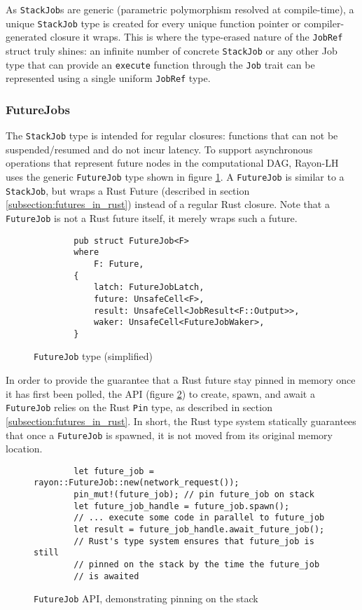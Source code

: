 \documentclass[bsc,frontabs,singlespacing,parskip,deptreport,normalheadings]{infthesis}
\begin{document}
As \texttt{StackJob}s are generic (parametric polymorphism resolved at
compile-time), a unique \texttt{StackJob} type is created for every unique
function pointer or compiler-generated closure it wraps. This is where the
type-erased nature of the \texttt{JobRef} struct truly shines: an infinite
number of concrete \texttt{StackJob} or any other Job type that can provide an
\texttt{execute} function through the \texttt{Job} trait can be represented
using a single uniform \texttt{JobRef} type.

\subsubsection*{FutureJobs}

The \texttt{StackJob} type is intended for regular closures: functions that can
not be suspended/resumed and do not incur latency. To support asynchronous
operations that represent future nodes in the computational DAG, Rayon-LH uses
the generic \texttt{FutureJob} type shown in figure \ref{fig:futurejob}. A
\texttt{FutureJob} is similar to a \texttt{StackJob}, but wraps a Rust Future
(described in section \ref{subsection:futures_in_rust}) instead of a regular
Rust closure. Note that a \texttt{FutureJob} is not a Rust future itself, it
merely wraps such a future.

\begin{figure}[ht]
    \begin{verbatim}
        pub struct FutureJob<F>
        where
            F: Future,
        {
            latch: FutureJobLatch,
            future: UnsafeCell<F>,
            result: UnsafeCell<JobResult<F::Output>>,
            waker: UnsafeCell<FutureJobWaker>,
        }
    \end{verbatim}
    \caption{\texttt{FutureJob} type (simplified)}
    \label{fig:futurejob}
\end{figure}

In order to provide the guarantee that a Rust future stay pinned in memory once
it has first been polled, the API (figure \ref{fig:future_job_api}) to create,
spawn, and await a \texttt{FutureJob} relies on the Rust \texttt{Pin} type, as
described in section \ref{subsection:futures_in_rust}. In short, the Rust type
system statically guarantees that once a \texttt{FutureJob} is spawned, it is
not moved from its original memory location.

\begin{figure}[ht]
    \begin{verbatim}
        let future_job = rayon::FutureJob::new(network_request());
        pin_mut!(future_job); // pin future_job on stack
        let future_job_handle = future_job.spawn();
        // ... execute some code in parallel to future_job
        let result = future_job_handle.await_future_job(); 
        // Rust's type system ensures that future_job is still
        // pinned on the stack by the time the future_job
        // is awaited
    \end{verbatim}
    \caption{\texttt{FutureJob} API, demonstrating pinning on the stack}
    \label{fig:future_job_api}
\end{figure}
\end{document}
